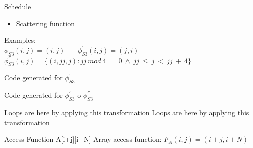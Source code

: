 \documentclass{beamer}
\begin{document}
\begin{frame}{Schedule}

 {
\begin{itemize}
\item Scattering function
\end{itemize}

\begin{block}{ }
{\tiny}
\end{block}
{\textbf{\color{red}{Assigning execution date for each statement instance. Instances with same execution dates can be run in parallel}}}
}
 {
Examples: \\
$\phi_{S3}(i,j) = (i,j)$ \pause\ \ \ $\phi^{'}_{S3}(i,j) = (j,i)$
$\phi^{''}_{S3}(i,j) = \{(i,jj,j):jj\ mod\ 4\ =\ 0\ \wedge\ jj\ \leq\ j\ <\ jj\ +\ 4\}$
}

 {
\begin{block}{Code generated for $\phi^{'}_{S3}$}
{\tiny}
\end{block}
}

 {
\begin{block}{Code generated for $\phi^{'}_{S3}$ o $\phi^{''}_{S3}$}
{\tiny}
\end{block}
}

 {
Loops are \textbf{\color{red}{interchanged}} here by applying this transformation
}
 {
Loops are \textbf{\color{red}{stripmined}} here by applying this transformation
}

\end{frame}

\begin{frame}{Access Function}
A[i+j][i+N]
\linebreak\linebreak
Array access function: $F_A(i,j) = (i+j,i+N)$ 
\linebreak\linebreak
{\textbf {\color{red}{Change array access function for better locality}}} \\
\end{frame}
\end{document}
